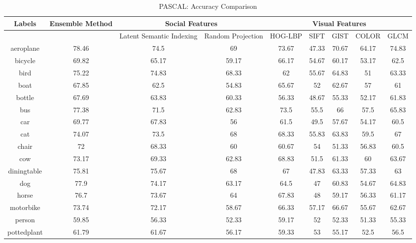 \newpage
\begin{sidewaystable}
\caption{ PASCAL: Accuracy Comparison} %
\vspace*{0.2 cm}
\begin{tabular}{|c|c|c|c|c|c|c|c|c|} %
Labels  & Ensemble Method  &\multicolumn{2}{c}{Social Features}  &\multicolumn{5}{c}{Visual Features}\\ [0.5ex] \hline %
 &  & Latent Semantic Indexing & Random Projection & HOG-LBP & SIFT & GIST & COLOR & GLCM \\  [1ex] \hline
aeroplane & 78.46 & 74.5 & 69 & 73.67 & 47.33 & 70.67 & 64.17 & 74.83\\  [1ex]
bicycle & 69.82 & 65.17 & 59.17 & 66.17 & 54.67 & 60.17 & 53.17 & 62.5\\  [1ex]
bird & 75.22 & 74.83 & 68.33 & 62 & 55.67 & 64.83 & 51 & 63.33\\  [1ex]
boat & 67.85 & 62.5 & 54.83 & 65.67 & 52 & 62.67 & 57 & 61\\  [1ex]
bottle & 67.69 & 63.83 & 60.33 & 56.33 & 48.67 & 55.33 & 52.17 & 61.83\\  [1ex]
bus & 77.38 & 71.5 & 62.83 & 73.5 & 55.5 & 66 & 57.5 & 65.83\\  [1ex]
car & 69.77 & 67.83 & 56 & 61.5 & 49.5 & 57.67 & 54.17 & 60.5\\  [1ex]
cat & 74.07 & 73.5 & 68 & 68.33 & 55.83 & 63.83 & 59.5 & 67\\  [1ex]
chair & 72 & 68.33 & 60 & 60.67 & 54 & 51.33 & 56.83 & 60.5\\  [1ex]
cow & 73.17 & 69.33 & 62.83 & 68.83 & 51.5 & 61.33 & 60 & 63.67\\  [1ex]
diningtable & 75.81 & 75.67 & 68 & 67 & 47.83 & 63.33 & 57.33 & 63\\  [1ex]
dog & 77.9 & 74.17 & 63.17 & 64.5 & 47 & 60.83 & 54.67 & 64.83\\  [1ex]
horse & 76.7 & 73.67 & 64 & 67.83 & 48 & 59.17 & 56.33 & 61.17\\  [1ex]
motorbike & 73.74 & 72.17 & 58.67 & 66.33 & 57.17 & 66.67 & 55.67 & 62.67\\  [1ex]
person & 59.85 & 56.33 & 52.33 & 59.17 & 52 & 52.33 & 51.33 & 55.33\\  [1ex]
pottedplant & 61.79 & 61.67 & 56.17 & 59.33 & 53 & 55.17 & 52.5 & 56.5\\  [1ex]

\end{tabular}
\end{sidewaystable}
